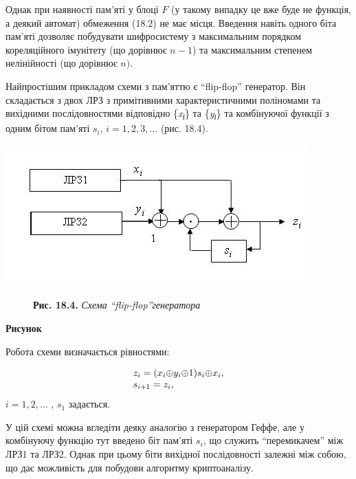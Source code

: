 \bigskip

 Однак при наявності пам’яті у блоці  ${F}$ (у такому випадку це вже буде не
функція, а деякий автомат) обмеження (18.2) не має місця. Введення навіть
одного біта пам’яті дозволяє побудувати шифросистему з максимальним порядком
кореляційного імунітету (що дорівнює  ${n-1}$) та максимальним степенем
нелінійності (що дорівнює  ${n)\text{.}}$

Найпростішим прикладом схеми з пам’яттю є “flip{}-flop” генератор. Він
складається з двох ЛРЗ з примітивними характеристичними поліномами та вихідними
послідовностями відповідно \{\textit{x}\textit{\textsubscript{і}}\} та
\{\textit{y}\textit{\textsubscript{і}}\} та комбінуючої функції з одним бітом
пам’яті  ${s_{{i}}}$,  ${i=1,2,3,\dots}$ (рис. 18.4). 

{\centering 
\includegraphics[width=4.5835in,height=2.1354in]{crypt-img/crypt-img340.jpg}
\par}

\begin{figure}
\centering
\begin{minipage}{3.1874in}
\textbf{Рис. 18.4. }\textit{Схема }\textit{“flip-flop”}\textit{генератора}
\end{minipage}
\end{figure}
{\centering\bfseries
Рисунок \stepcounter{}{\the}
\par}


\bigskip

Робота схеми визначається рівностями:

\begin{equation*}
\begin{matrix}{z_{{i}}=(x_{{i}}{\oplus}y_{{i}}{\oplus}1)s_{{i}}{\oplus}x_{{i}},}\hfill\null
\\s_{{i+1}}=z_{{i}},\hfill\null \end{matrix}\hfill 
\end{equation*}
 ${i=1,2,\dots}$ ,   ${s_{{1}}}$ задається.

У цій схемі можна вгледіти деяку аналогію з генератором Геффе, але у комбінуючу
функцію тут введено біт пам’яті  ${s_{{i}}}$, що служить “перемикачем” між ЛРЗ1
та ЛРЗ2. Однак при цьому біти вихідної послідовності залежні між собою, що дає
можливість для побудови алгоритму криптоаналізу.

